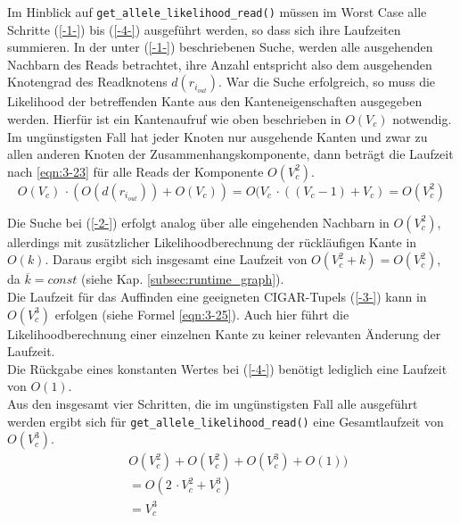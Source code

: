 Im Hinblick auf \lstinline|get_allele_likelihood_read()| müssen im Worst Case alle Schritte (\ref{-1-}) bis (\ref{-4-}) ausgeführt werden, so dass sich ihre Laufzeiten summieren. In der unter (\ref{-1-}) beschriebenen Suche, werden alle ausgehenden Nachbarn des Reads betrachtet, ihre Anzahl entspricht also dem ausgehenden Knotengrad des Readknotens $d(r_{i_{out}})$. War die Suche erfolgreich, so muss die Likelihood der betreffenden Kante aus den Kanteneigenschaften ausgegeben werden. Hierfür ist ein Kantenaufruf wie oben beschrieben in $ O(V_{c}) $ notwendig. Im ungünstigsten Fall hat jeder Knoten nur ausgehende Kanten und zwar zu allen anderen Knoten der Zusammenhangskomponente, dann beträgt die Laufzeit nach \eqref{eqn:3-23} für alle Reads der Komponente $ O(V_{c}^2)$.
\begin{equation} \label{eqn:3-23}
\tag{3-23}
O(V_{c}) \, \cdotp (O(d(r_{i_{out}})) +  O(V_{c})) = O(V_{c} \, \cdotp ((V_{c}-1) + V_{c})  = O(V_{c}^2)
\end{equation} 

Die Suche bei (\ref{-2-}) erfolgt analog über alle eingehenden Nachbarn in $ O(V_{c}^2)$, allerdings mit zusätzlicher Likelihoodberechnung der rückläufigen Kante in $O(k)$. Daraus ergibt sich insgesamt eine Laufzeit von $ O(V_{c}^2 +k) = O(V_{c}^2)$, da $\overline{k}=const$ (siehe Kap. \ref{subsec:runtime_graph}).\\

Die Laufzeit für das Auffinden eine geeigneten CIGAR-Tupels (\ref{-3-}) kann in $O(V_{c}^3)$ erfolgen (siehe Formel \eqref{eqn:3-25}). Auch hier führt die Likelihoodberechnung einer einzelnen Kante zu keiner relevanten Änderung der Laufzeit.\\

Die Rückgabe eines konstanten Wertes bei (\ref{-4-}) benötigt lediglich eine Laufzeit von $ O(1) $.\\

Aus den insgesamt vier Schritten, die im ungünstigsten Fall alle ausgeführt werden ergibt sich für \lstinline|get_allele_likelihood_read()| eine Gesamtlaufzeit von $O(V_{c}^3)$. \\
\begin{equation} \label{eqn:3-24}
\tag{3-24}
\begin{aligned}
&\ {} O(V_{c}^2) + O(V_{c}^2) + O(V_{c}^3) + O(1))  \\
& \ = O(2 \, \cdotp V_{c}^2 + V_{c}^3 )\\
&\ = V_{c}^3\\
\end{aligned}
\end{equation}

